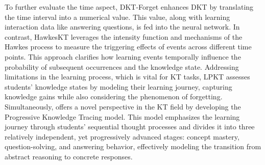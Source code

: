 To further evaluate the time aspect, DKT-Forget \cite{DKT+Forget} enhances DKT by translating the time interval into a numerical value. This value, along with learning interaction data like answering questions, is fed into the neural network. In contrast, HawkesKT \cite{HawkesKT} leverages the intensity function and mechanisms of the Hawkes process to measure the triggering effects of events across different time points. This approach clarifies how learning events temporally influence the probability of subsequent occurrences and the knowledge state.
Addressing limitations in the learning process, which is vital for KT tasks, LPKT \cite{LPKT} assesses students’ knowledge states by modeling their learning journey, capturing knowledge gains while also considering the phenomenon of forgetting. Simultaneously, \citet{ProKT} offers a novel perspective in the KT field by developing the Progressive Knowledge Tracing model. This model emphasizes the learning journey through students’ sequential thought processes and divides it into three relatively independent, yet progressively advanced stages: concept mastery, question-solving, and answering behavior, effectively modeling the transition from abstract reasoning to concrete responses.


